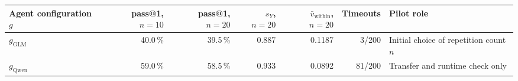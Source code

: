 \begin{tabular}{@{}lrrrrrp{3.5cm}@{}}
  \toprule
  Agent configuration $g$ & pass@1, $n=10$ & pass@1, $n=20$ & $s_Y$, $n=20$ & $\bar v_{\mathrm{within}}$, $n=20$ & Timeouts & Pilot role \\
  \midrule
  $g_{\mathrm{GLM}}$ & 40.0\,\% & 39.5\,\% & 0.887 & 0.1187 & 3/200 & Initial choice of repetition count $n$ \\
  \rowcolor{black!6} $g_{\mathrm{Qwen}}$ & 59.0\,\% & 58.5\,\% & 0.933 & 0.0892 & 81/200 & Transfer and runtime check only \\
  \bottomrule
\end{tabular}
